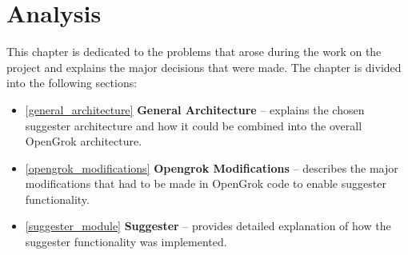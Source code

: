 \chapter{Analysis}
\label{chap:analysis}

This chapter is dedicated to the problems that arose during the work on the project and explains the major decisions
that were made. The chapter is divided into the following sections:
\begin{itemize}
    \item \ref{general_architecture} \textbf{General Architecture} – explains the chosen suggester architecture and
    how it could be combined into the overall OpenGrok architecture.
    \item \ref{opengrok_modifications} \textbf{Opengrok Modifications} – describes the major modifications that had
    to be made in OpenGrok code to enable suggester functionality.
    \item \ref{suggester_module} \textbf{Suggester} – provides detailed explanation of how the suggester functionality
    was implemented.
\end{itemize}

